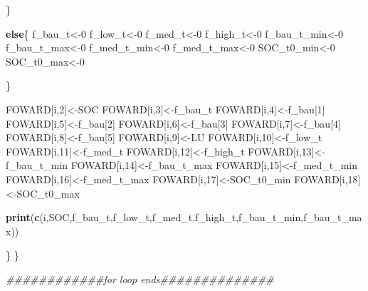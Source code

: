 \documentclass[
  10pt,
  b5paper,
]{book}
\newenvironment{Shaded}{\begin{snugshade}}{\end{snugshade}}
\newcommand{\CommentTok}[1]{\textcolor[rgb]{0.56,0.35,0.01}{\textit{#1}}}
\newcommand{\ControlFlowTok}[1]{\textcolor[rgb]{0.13,0.29,0.53}{\textbf{#1}}}
\newcommand{\DecValTok}[1]{\textcolor[rgb]{0.00,0.00,0.81}{#1}}
\newcommand{\KeywordTok}[1]{\textcolor[rgb]{0.13,0.29,0.53}{\textbf{#1}}}
\newcommand{\NormalTok}[1]{#1}
\begin{document}
\begin{Shaded}
\begin{Highlighting}[]
{\NormalTok{\}}

\ControlFlowTok{else}\NormalTok{\{}
\NormalTok{f_bau_t<-}\DecValTok{0}
\NormalTok{f_low_t<-}\DecValTok{0}
\NormalTok{f_med_t<-}\DecValTok{0}
\NormalTok{f_high_t<-}\DecValTok{0}
\NormalTok{f_bau_t_min<-}\DecValTok{0}
\NormalTok{f_bau_t_max<-}\DecValTok{0}
\NormalTok{f_med_t_min<-}\DecValTok{0}
\NormalTok{f_med_t_max<-}\DecValTok{0}
\NormalTok{SOC_t0_min<-}\DecValTok{0}
\NormalTok{SOC_t0_max<-}\DecValTok{0}

\NormalTok{\}}


\NormalTok{FOWARD[i,}\DecValTok{2}\NormalTok{]<-SOC}
\NormalTok{FOWARD[i,}\DecValTok{3}\NormalTok{]<-f_bau_t}
\NormalTok{FOWARD[i,}\DecValTok{4}\NormalTok{]<-f_bau[}\DecValTok{1}\NormalTok{]}
\NormalTok{FOWARD[i,}\DecValTok{5}\NormalTok{]<-f_bau[}\DecValTok{2}\NormalTok{]}
\NormalTok{FOWARD[i,}\DecValTok{6}\NormalTok{]<-f_bau[}\DecValTok{3}\NormalTok{]}
\NormalTok{FOWARD[i,}\DecValTok{7}\NormalTok{]<-f_bau[}\DecValTok{4}\NormalTok{]}
\NormalTok{FOWARD[i,}\DecValTok{8}\NormalTok{]<-f_bau[}\DecValTok{5}\NormalTok{]}
\NormalTok{FOWARD[i,}\DecValTok{9}\NormalTok{]<-LU}
\NormalTok{FOWARD[i,}\DecValTok{10}\NormalTok{]<-f_low_t}
\NormalTok{FOWARD[i,}\DecValTok{11}\NormalTok{]<-f_med_t}
\NormalTok{FOWARD[i,}\DecValTok{12}\NormalTok{]<-f_high_t}
\NormalTok{FOWARD[i,}\DecValTok{13}\NormalTok{]<-f_bau_t_min}
\NormalTok{FOWARD[i,}\DecValTok{14}\NormalTok{]<-f_bau_t_max}
\NormalTok{FOWARD[i,}\DecValTok{15}\NormalTok{]<-f_med_t_min}
\NormalTok{FOWARD[i,}\DecValTok{16}\NormalTok{]<-f_med_t_max}
\NormalTok{FOWARD[i,}\DecValTok{17}\NormalTok{]<-SOC_t0_min}
\NormalTok{FOWARD[i,}\DecValTok{18}\NormalTok{]<-SOC_t0_max}



\KeywordTok{print}\NormalTok{(}\KeywordTok{c}\NormalTok{(i,SOC,f_bau_t,f_low_t,f_med_t,f_high_t,f_bau_t_min,f_bau_t_max))}

\NormalTok{\}}
\NormalTok{\}}

\CommentTok{############for loop ends##############}


}
\end{Highlighting}
\end{Shaded}
\end{document}
